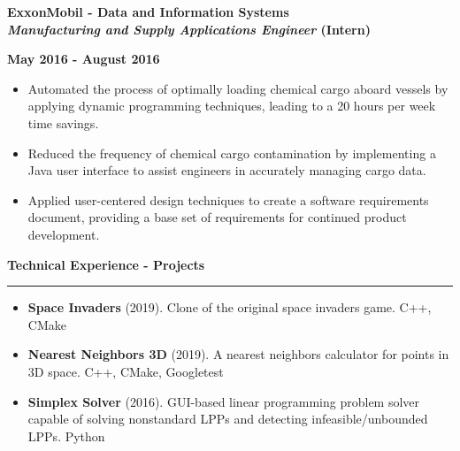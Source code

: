 \documentclass[10pt,letterpaper]{article}
\begin{document}
\medskip

\begin{minipage}[t]{0.53\textwidth}
    \begin{flushleft}
        \textbf{ExxonMobil - Data and Information Systems}\\
        \textbf{\textit{Manufacturing and Supply Applications Engineer} (Intern)}\\
    \end{flushleft}
\end{minipage}
\begin{minipage}[t]{0.44\textwidth}
    \begin{flushright}
        \textbf{May 2016 - August 2016}
    \end{flushright}
\end{minipage}

\begin{itemize}[noitemsep,topsep=0pt]
    \setlength\itemsep{0.1em}
    \item Automated the process of optimally loading chemical cargo aboard
        vessels by applying dynamic programming techniques, leading to a 20
        hours per week time savings.
    \item Reduced the frequency of chemical cargo contamination by implementing
        a Java user interface to assist engineers in accurately managing cargo
        data.
    \item Applied user-centered design techniques to create a software
        requirements document, providing a base set of requirements for
        continued product development.
\end{itemize}

\medskip

\begin{large}
    \textbf{Technical Experience - Projects}
\end{large}

\smallskip \hrule \smallskip

\begin{itemize}[topsep=0pt]
    \setlength\itemsep{0.1em}
    \item \textbf{Space Invaders} (2019). Clone of the original space invaders
          game. C++, CMake
    \item \textbf{Nearest Neighbors 3D} (2019). A nearest neighbors calculator
          for points in 3D space. C++, CMake, Googletest
    \item \textbf{Simplex Solver} (2016). GUI-based linear programming problem
          solver capable of solving nonstandard LPPs and detecting
          infeasible/unbounded LPPs. Python
\end{itemize}
\end{document}
